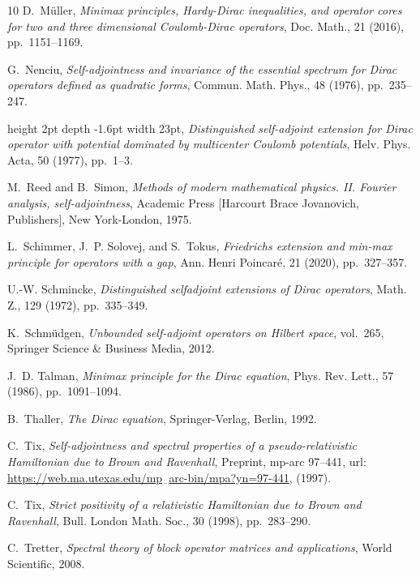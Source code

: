 \documentclass[12pt,reqno]{amsart}
\renewcommand{\(}{\left(}
\renewcommand{\)}{\right)}
\begin{document}
\begin{thebibliography}{10}
{\sc D.~M\"{u}ller}, {\em Minimax principles, {H}ardy-{D}irac inequalities, and
  operator cores for two and three dimensional {C}oulomb-{D}irac operators},
  Doc. Math., 21 (2016), pp.~1151--1169.

{\sc G.~Nenciu}, {\em Self-adjointness and invariance of the essential spectrum
  for {D}irac operators defined as quadratic forms}, Commun. Math. Phys., 48
  (1976), pp.~235--247.

\leavevmode\vrule height 2pt depth -1.6pt width 23pt, {\em Distinguished
  self-adjoint extension for {D}irac operator with potential dominated by
  multicenter {C}oulomb potentials}, Helv. Phys. Acta, 50 (1977), pp.~1--3.

{\sc M.~Reed and B.~Simon}, {\em Methods of modern mathematical physics. {II}.
  {F}ourier analysis, self-adjoint\-ness}, Academic Press [Harcourt Brace
  Jovanovich, Publishers], New York-London, 1975.

{\sc L.~Schimmer, J.~P. Solovej, and S.~Tokus}, {\em Friedrichs extension and
  min-max principle for operators with a gap}, Ann. Henri Poincar\'{e}, 21
  (2020), pp.~327--357.

{\sc U.-W. Schmincke}, {\em Distinguished selfadjoint extensions of {D}irac
  operators}, Math. Z., 129 (1972), pp.~335--349.

{\sc K.~Schm{\"u}dgen}, {\em Unbounded self-adjoint operators on Hilbert
  space}, vol.~265, Springer Science \& Business Media, 2012.

{\sc J.~D. {Talman}}, {\em Minimax principle for the {D}irac equation}, Phys.
  Rev. Lett., 57 (1986), pp.~1091--1094.

{\sc B.~Thaller}, {\em The {D}irac equation}, Springer-Verlag, Berlin, 1992.

{\sc C.~Tix}, {\em Self-adjointness and spectral properties of a
  pseudo-relativistic {H}amiltonian due to {B}rown and {R}avenhall}, Preprint,
  mp-arc 97--441, url:
  \href{https://web.ma.utexas.edu/mp_arc-bin/mpa?yn=97-441}{https://web.ma.utexas.edu/mp$\underline{\phantom{x}}$arc-bin/mpa?yn=97-441},
   (1997).

{\sc C.~Tix}, {\em Strict positivity of a relativistic {H}amiltonian due to
  {B}rown and {R}avenhall}, Bull. London Math. Soc., 30 (1998), pp.~283--290.

{\sc C.~Tretter}, {\em Spectral theory of block operator matrices and
  applications}, World Scientific, 2008.


\end{thebibliography}
\end{document}

